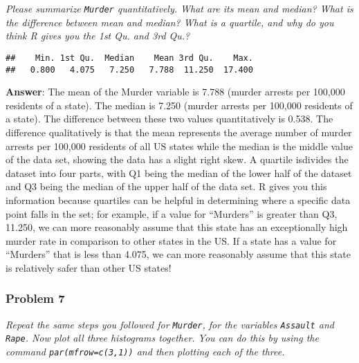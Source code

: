 \documentclass[
]{article}
\newenvironment{Shaded}{\begin{snugshade}}{\end{snugshade}}
\newcommand{\FunctionTok}[1]{\textcolor[rgb]{0.00,0.00,0.00}{#1}}
\newcommand{\NormalTok}[1]{#1}
\newcommand{\SpecialCharTok}[1]{\textcolor[rgb]{0.00,0.00,0.00}{#1}}
\begin{document}
\emph{Please summarize \texttt{Murder} quantitatively. What are its mean
and median? What is the difference between mean and median? What is a
quartile, and why do you think R gives you the 1st Qu. and 3rd Qu.?}

\begin{Shaded}
\end{Shaded}

\begin{verbatim}
##    Min. 1st Qu.  Median    Mean 3rd Qu.    Max. 
##   0.800   4.075   7.250   7.788  11.250  17.400
\end{verbatim}

\textbf{Answer}: The mean of the Murder variable is 7.788 (murder
arrests per 100,000 residents of a state). The median is 7.250 (murder
arrests per 100,000 residents of a state). The difference between these
two values quantitatively is 0.538. The difference qualitatively is that
the mean represents the average number of murder arrests per 100,000
residents of all US states while the median is the middle value of the
data set, showing the data has a slight right skew. A quartile isdivides
the dataset into four parts, with Q1 being the median of the lower half
of the dataset and Q3 being the median of the upper half of the data
set. R gives you this information because quartiles can be helpful in
determining where a specific data point falls in the set; for example,
if a value for ``Murders'' is greater than Q3, 11.250, we can more
reasonably assume that this state has an exceptionally high murder rate
in comparison to other states in the US. If a state has a value for
``Murders'' that is less than 4.075, we can more reasonably assume that
this state is relatively safer than other US states!

\hypertarget{problem-7}{%
\subsubsection{Problem 7}\label{problem-7}}

\emph{Repeat the same steps you followed for \texttt{Murder}, for the
variables \texttt{Assault} and \texttt{Rape}. Now plot all three
histograms together. You can do this by using the command
\texttt{par(mfrow=c(3,1))} and then plotting each of the three. }
\end{document}
